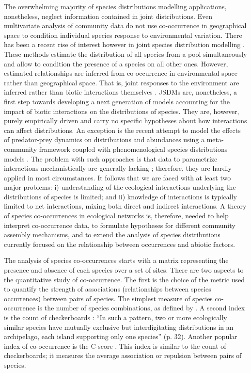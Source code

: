 The overwhelming majority of species distributions modelling applications, nonetheless, neglect information contained in joint distributions. Even multivariate analysis of community data \citep[\textit{e.g.} redundancy analysis -][]{legendre2012numerical} do not use co-occurrence in geographical space to condition individual species response to environmental variation. There has been a recent rise of interest however in joint species distribution modelling \citep{Clark2014, Harris2015, Pollock2014}. These methods estimate the distribution of all species from a pool simultaneously and allow to condition the presence of a species on all other ones. However, estimated relationships are inferred from co-occurrence in environmental space rather than geographical space. That is, joint responses to the environment are inferred rather than biotic interactions themselves \citep{Baselga2009}. JSDMs are, nonetheless, a first step towards developing a next generation of models accounting for the impact of biotic interactions on the distributions of species. They are, however, purely empirically driven and carry no specific hypotheses about how interactions can affect distributions. An exception is the recent attempt to model the effects of predator-prey dynamics on distributions and abundances using a meta- community framework coupled with phenomenological species distributions models \citep{Fordham2013}. The problem with such approaches is that data to parametrize interactions mechanistically are generally lacking \citep{Morales-Castilla2015}; therefore, they are hardly applied in most circumstances. It follows that we are faced with at least two major problems: i) understanding of the ecological interactions underlying the distributions of species is limited; and ii) knowledge of interactions is typically limited to net interactions, mixing both direct and indirect interactions. A theory of species co-occurrences in ecological networks is, therefore, needed to help interpret co-occurrence data, to formulate hypotheses for different community assembly mechanisms, and to extend the analysis of species distributions currently focused on the relationship between occurrences and abiotic factors.

The analysis of species co-occurrences starts with a matrix representing the presence and absence of each species over a set of sites. There are two aspects to the quantitative study of co-occurrence. The first is the choice of the metric used to quantify the strength of associations (relationships between species occurrences) between pairs of species. The simplest measure of species co-occurrence is the number of species combinations, as defined by \cite{Pielou1968}. A second
index is the count of checkerboards \cite{Diamond1975}: ``In such a
pattern, two or more ecologically similar species have mutually exclusive but
interdigitating distributions in an archipelago, each island supporting only
one species'' (p. 32). Another popular index of co-occurrence is the C-score
\citep{Stone1990}. This index is similar to the count of
checkerboards; it measures the average association or repulsion between pairs
of species.

